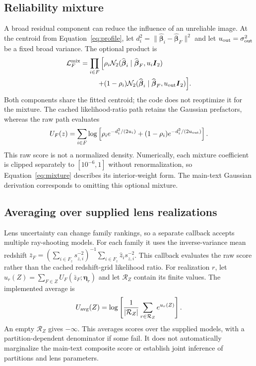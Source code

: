 \documentclass[twocolumn,twocolappendix,linenumbers]{aastex701}
\newcommand{\N}{\mathcal{N}}
\begin{document}
\subsection{Reliability mixture}
A broad residual component can reduce the influence of an unreliable image.
At the centroid from Equation~\ref{eq:profile}, let $d_i^2=\|\widehat{\boldsymbol\beta}_i-\widehat{\boldsymbol\beta}_F\|^2$ and let $u_{\rm out}=\sigma_{\rm out}^2$ be a fixed broad variance.
The optional product is
\begin{equation}
 \begin{aligned}
 \mathcal L_F^{\rm mix}=\prod_{i\in F}\Big[&
 \rho_i\N_2(\widehat{\boldsymbol\beta}_i\mid
               \widehat{\boldsymbol\beta}_F,u_i\boldsymbol I_2)\\
 {}+&(1-\rho_i)\N_2(\widehat{\boldsymbol\beta}_i\mid
               \widehat{\boldsymbol\beta}_F,u_{\rm out}\boldsymbol I_2)
 \Big].
 \end{aligned}
 \label{eq:mixture}
\end{equation}
Both components share the fitted centroid; the code does not reoptimize it for the mixture.
The cached likelihood-ratio path retains the Gaussian prefactors, whereas the raw path evaluates
\begin{equation}
 U_F(z)=\sum_{i\in F}\log\left[
 \rho_i e^{-d_i^2/(2u_i)}
 +(1-\rho_i)e^{-d_i^2/(2u_{\rm out})}\right].
 \label{eq:raw}
\end{equation}
This raw score is not a normalized density.
Numerically, each mixture coefficient is clipped separately to $[10^{-6},1]$ without renormalization, so Equation~\ref{eq:mixture} describes its interior-weight form.
The main-text Gaussian derivation corresponds to omitting this optional mixture.

\subsection{Averaging over supplied lens realizations}
Lens uncertainty can change family rankings, so a separate callback accepts multiple ray-shooting models.
For each family it uses the inverse-variance mean redshift $\bar z_F=(\sum_{i\in F_z}s_{z,i}^{-2})^{-1}\sum_{i\in F_z}\hat z_i s_{z,i}^{-2}$.
This callback evaluates the raw score rather than the cached redshift-grid likelihood ratio.
For realization $r$, let $u_r(Z)=\sum_{F\in Z}U_F(\bar z_F;\boldsymbol\eta_r)$ and let $\mathcal R_Z$ contain its finite values.
The implemented average is
\begin{equation}
 U_{\rm avg}(Z)=\log\left[
 \frac{1}{|\mathcal R_Z|}\sum_{r\in\mathcal R_Z}e^{u_r(Z)}\right].
 \label{eq:lensaverage}
\end{equation}
An empty $\mathcal R_Z$ gives $-\infty$.
This averages scores over the supplied models, with a partition-dependent denominator if some fail.
It does not automatically marginalize the main-text composite score or establish joint inference of partitions and lens parameters.


{}

\end{document}
